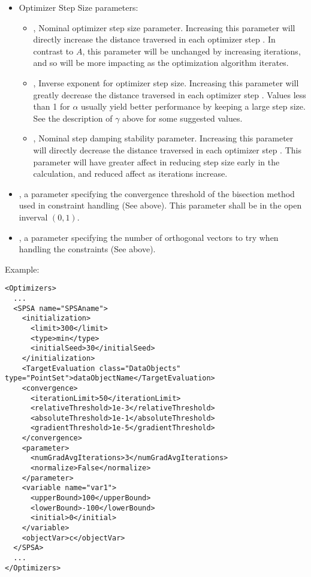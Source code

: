 \begin{itemize}
\begin{itemize}
  \item Optimizer Step Size parameters:
    \begin{itemize}
      \item {},  Nominal optimizer step size parameter.  Increasing
        this parameter will directly increase the distance traversed in each optimizer step
        \cite{spall1998implementation}. In contrast to $A$, this parameter will be unchanged by increasing
        iterations, and so will be more impacting as the optimization algorithm iterates. 
      \item {},  Inverse exponent for optimizer step size.
        Increasing this parameter will greatly decrease the distance traversed in each optimizer step
        \cite{spall1998implementation}. Values less than 1 for $\alpha$ usually yield better performance by
        keeping a large step size. See the description of $\gamma$ above for some suggested values. 
      \item {},  Nominal step damping stability parameter.  Increasing this
        parameter will directly decrease the distance traversed in each optimizer step
        \cite{spall1998implementation}. This parameter will have greater affect in reducing step size early in
        the calculation, and reduced affect as iterations increase. 
    \end{itemize}
  \item {},  a parameter specifying the convergence threshold of the
  bisection method used in constraint handling (See above). This parameter shall be in the open inverval $(0,1)$.
  \item {},  a parameter specifying the number of orthogonal vectors to try
  when handling the constraints (See above).
  \end{itemize}
\end{itemize}


Example:
\begin{lstlisting}[style=XML]
<Optimizers>
  ...
  <SPSA name="SPSAname">
    <initialization>
      <limit>300</limit>
      <type>min</type>
      <initialSeed>30</initialSeed>
    </initialization>
    <TargetEvaluation class="DataObjects" type="PointSet">dataObjectName</TargetEvaluation>
    <convergence>
      <iterationLimit>50</iterationLimit>
      <relativeThreshold>1e-3</relativeThreshold>
      <absoluteThreshold>1e-1</absoluteThreshold>
      <gradientThreshold>1e-5</gradientThreshold>
    </convergence>
    <parameter>
      <numGradAvgIterations>3</numGradAvgIterations>
      <normalize>False</normalize>
    </parameter>
    <variable name="var1">
      <upperBound>100</upperBound>
      <lowerBound>-100</lowerBound>
      <initial>0</initial>
    </variable>
    <objectVar>c</objectVar>
  </SPSA>
  ...
</Optimizers>
\end{lstlisting}
